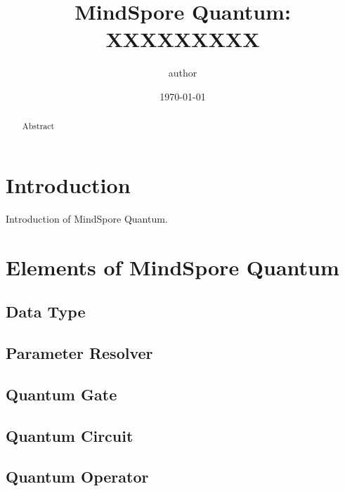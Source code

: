 \documentclass[pra,twocolumn,superscriptaddress,floatfix,nofootinbib,amsmath,amssymb]{revtex4-1}
\begin{document}
\title{MindSpore Quantum: XXXXXXXXX
}



\author{author}


\date{\today}



\begin{abstract}
Abstract
\end{abstract}
\maketitle
\tableofcontents

\section{Introduction}
Introduction of MindSpore Quantum.


\section{Elements of MindSpore Quantum}

\subsection{Data Type}


\subsection{Parameter Resolver}


\subsection{Quantum Gate}


\subsection{Quantum Circuit}


\subsection{Quantum Operator}

\end{document}
